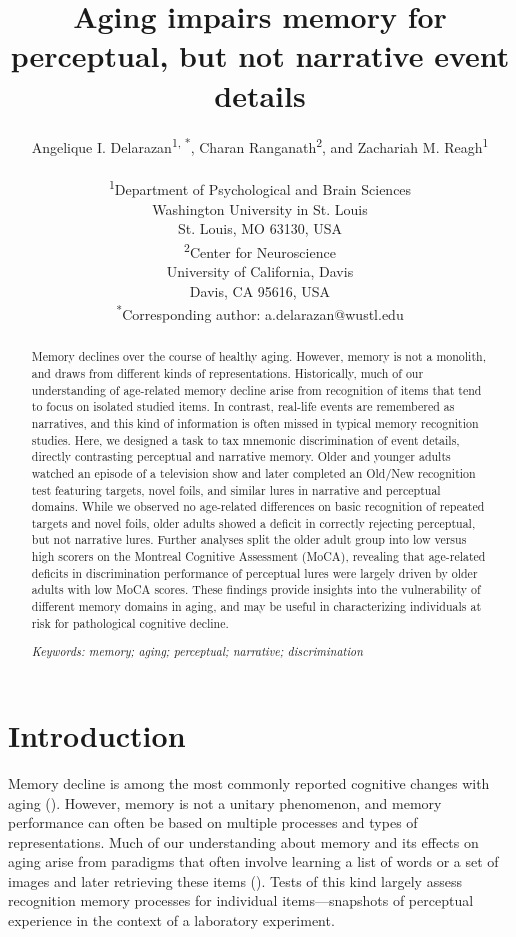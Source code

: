 \documentclass[11pt]{article}
\title{Aging impairs memory for perceptual, but not narrative event details}
\author{Angelique I. Delarazan\textsuperscript{1, *}, Charan Ranganath\textsuperscript{2}, and Zachariah M. Reagh\textsuperscript{1}\\\\ \textsuperscript{1}Department of Psychological and Brain Sciences\\
Washington University in St. Louis \\
St. Louis, MO 63130, USA\\
\textsuperscript{2}Center for Neuroscience\\
University of California, Davis \\
Davis, CA 95616, USA\\
\textsuperscript{*}Corresponding author: a.delarazan@wustl.edu}
\date{}
\begin{document}
\begin{titlepage}
  \maketitle
  \thispagestyle{empty}
  \end{titlepage}

\begin{abstract}
Memory declines over the course of healthy aging. However, memory is not a monolith, and draws from different kinds of representations. Historically, much of our understanding of age-related memory decline arise from recognition of items that tend to focus on isolated studied items. In contrast, real-life events are remembered as narratives, and this kind of information is often missed in typical memory recognition studies.  Here, we designed a task to tax mnemonic discrimination of event details, directly contrasting perceptual and narrative memory. Older and younger adults watched an episode of a television show and later completed an Old/New recognition test featuring targets, novel foils, and similar lures in narrative and perceptual domains. While we observed no age-related differences on basic recognition of repeated targets and novel foils, older adults showed a deficit in correctly rejecting perceptual, but not narrative lures. Further analyses split the older adult group into low versus high scorers on the Montreal Cognitive Assessment (MoCA), revealing that age-related deficits in discrimination performance of perceptual lures were largely driven by older adults with low MoCA scores. These findings provide insights into the vulnerability of different memory domains in aging, and may be useful in characterizing individuals at risk for pathological cognitive decline.

\textit{Keywords: memory; aging; perceptual; narrative; discrimination} 
\end{abstract}

\section*{Introduction}
Memory decline is among the most commonly reported cognitive changes with aging (\cite{craik_memory_1994}). However, memory is not a unitary phenomenon, and memory performance can often be based on multiple processes and types of representations. Much of our understanding about memory and its effects on aging arise from paradigms that often involve learning a list of words or a set of images and later retrieving these items (\cite{fraundorf_aging_2019}). Tests of this kind largely assess recognition memory processes for individual items—snapshots of perceptual experience in the context of a laboratory experiment.
\end{document}
